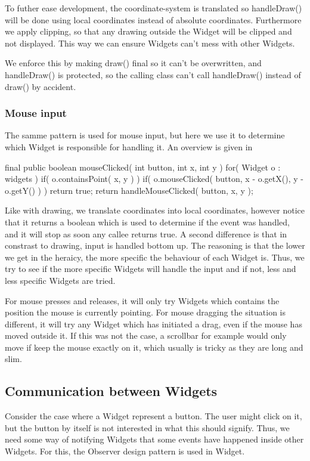 To futher ease development, the coordinate-system is translated so handleDraw() will be done using local coordinates instead of absolute coordinates. Furthermore we apply clipping, so that any drawing outside the Widget will be clipped and not displayed. This way we can ensure Widgets can't mess with other Widgets.

We enforce this by making draw() final so it can't be overwritten, and handleDraw() is protected, so the calling class can't call handleDraw() instead of draw() by accident.


\subsubsection{Mouse input}

The samme pattern is used for mouse input, but here we use it to determine which Widget is responsible for handling it. An overview is given in 

	final public boolean mouseClicked( int button, int x, int y ){
		for( Widget o : widgets )
			if( o.containsPoint( x, y ) )
				if( o.mouseClicked( button, x - o.getX(), y - o.getY() ) )
					return true;
		return handleMouseClicked( button, x, y );
	}

Like with drawing, we translate coordinates into local coordinates, however notice that it returns a boolean which is used to determine if the event was handled, and it will stop as soon any callee returns true. A second difference is that in constrast to drawing, input is handled bottom up. The reasoning is that the lower we get in the heraicy, the more specific the behaviour of each Widget is. Thus, we try to see if the more specific Widgets will handle the input and if not, less and less specific Widgets are tried.

For mouse presses and releases, it will only try Widgets which contains the position the mouse is currently pointing. For mouse dragging the situation is different, it will try any Widget which has initiated a drag, even if the mouse has moved outside it. If this was not the case, a scrollbar for example would only move if keep the mouse exactly on it, which usually is tricky as they are long and slim.


\subsection{Communication between Widgets}

Consider the case where a Widget represent a button. The user might click on it, but the button by itself is not interested in what this should signify. Thus, we need some way of notifying Widgets that some events have happened inside other Widgets. For this, the Observer design pattern is used in Widget.


